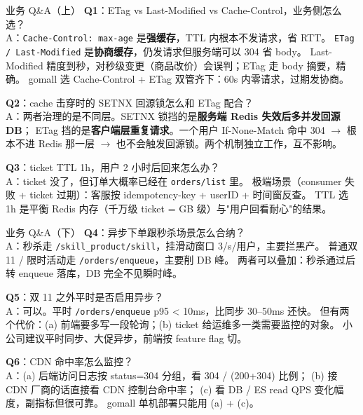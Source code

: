 \begin{frame}{业务 Q\&A（上）}
\textbf{Q1}：ETag vs Last-Modified vs Cache-Control，业务侧怎么选？\\
\hspace{4mm}\small A：\texttt{Cache-Control: max-age} 是\textbf{强缓存}，TTL 内根本不发请求，省 RTT。
\texttt{ETag / Last-Modified} 是\textbf{协商缓存}，仍发请求但服务端可以 304 省 body。
Last-Modified 精度到秒，对秒级变更（商品改价）会误判；ETag 走 body 摘要，精确。
gomall 选 Cache-Control + ETag 双管齐下：60s 内零请求，过期发协商。

\vspace{2mm}
\textbf{Q2}：cache 击穿时的 SETNX 回源锁怎么和 ETag 配合？\\
\hspace{4mm}\small A：两者治理的是不同层。SETNX 锁挡的是\textbf{服务端 Redis 失效后多并发回源 DB}；
ETag 挡的是\textbf{客户端层重复请求}。一个用户 If-None-Match 命中 304 $\to$ 根本不进 Redis 那一层 $\to$ 也不会触发回源锁。两个机制独立工作，互不影响。

\vspace{2mm}
\textbf{Q3}：ticket TTL 1h，用户 2 小时后回来怎么办？\\
\hspace{4mm}\small A：ticket 没了，但订单大概率已经在 \texttt{orders/list} 里。
极端场景（consumer 失败 + ticket 过期）：客服按 idempotency-key + userID + 时间窗反查。
TTL 选 1h 是平衡 Redis 内存（千万级 ticket = GB 级）与"用户回看耐心"的结果。
\end{frame}

\begin{frame}{业务 Q\&A（下）}
\textbf{Q4}：异步下单跟秒杀场景怎么合纳？\\
\hspace{4mm}\small A：秒杀走 \texttt{/skill\_product/skill}，挂滑动窗口 3/s/用户，主要拦黑产。
普通双 11 / 限时活动走 \texttt{/orders/enqueue}，主要削 DB 峰。
两者可以叠加：秒杀通过后转 enqueue 落库，DB 完全不见瞬时峰。

\vspace{2mm}
\textbf{Q5}：双 11 之外平时是否启用异步？\\
\hspace{4mm}\small A：可以。平时 \texttt{/orders/enqueue} p95 < 10ms，比同步 30--50ms 还快。
但有两个代价：(a) 前端要多写一段轮询；(b) ticket 给运维多一类需要监控的对象。
小公司建议平时同步、大促异步，前端按 feature flag 切。

\vspace{2mm}
\textbf{Q6}：CDN 命中率怎么监控？\\
\hspace{4mm}\small A：(a) 后端访问日志按 status=304 分组，看 304 / (200+304) 比例；
(b) 接 CDN 厂商的话直接看 CDN 控制台命中率；
(c) 看 DB / ES read QPS 变化幅度，副指标但很可靠。
gomall 单机部署只能用 (a) + (c)。
\end{frame}


